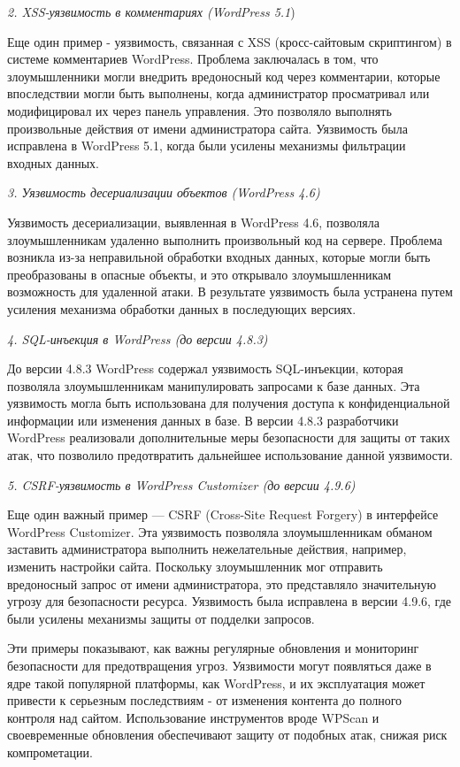 \begin{multicols}{2}
\emph{2. XSS-уязвимость в комментариях (WordPress 5.1})

Еще один пример - уязвимость, связанная с XSS (кросс-сайтовым
скриптингом) в системе комментариев WordPress. Проблема заключалась в
том, что злоумышленники могли внедрить вредоносный код через
комментарии, которые впоследствии могли быть выполнены, когда
администратор просматривал или модифицировал их через панель управления.
Это позволяло выполнять произвольные действия от имени администратора
сайта. Уязвимость была исправлена в WordPress 5.1, когда были усилены
механизмы фильтрации входных данных.

\emph{3. Уязвимость десериализации объектов (WordPress 4.6)}

Уязвимость десериализации, выявленная в WordPress 4.6, позволяла
злоумышленникам удаленно выполнить произвольный код на сервере. Проблема
возникла из-за неправильной обработки входных данных, которые могли быть
преобразованы в опасные объекты, и это открывало злоумышленникам
возможность для удаленной атаки. В результате уязвимость была устранена
путем усиления механизма обработки данных в последующих версиях.

\emph{4. SQL-инъекция в WordPress (до версии 4.8.3)}

До версии 4.8.3 WordPress содержал уязвимость SQL-инъекции, которая
позволяла злоумышленникам манипулировать запросами к базе данных. Эта
уязвимость могла быть использована для получения доступа к
конфиденциальной информации или изменения данных в базе. В версии 4.8.3
разработчики WordPress реализовали дополнительные меры безопасности для
защиты от таких атак, что позволило предотвратить дальнейшее
использование данной уязвимости.

\emph{5. CSRF-уязвимость в WordPress Customizer (до версии 4.9.6)}

Еще один важный пример --- CSRF (Cross-Site Request Forgery) в
интерфейсе WordPress Customizer. Эта уязвимость позволяла
злоумышленникам обманом заставить администратора выполнить нежелательные
действия, например, изменить настройки сайта. Поскольку злоумышленник
мог отправить вредоносный запрос от имени администратора, это
представляло значительную угрозу для безопасности ресурса. Уязвимость
была исправлена в версии 4.9.6, где были усилены механизмы защиты от
подделки запросов.

Эти примеры показывают, как важны регулярные обновления и мониторинг
безопасности для предотвращения угроз. Уязвимости могут появляться даже
в ядре такой популярной платформы, как WordPress, и их эксплуатация
может привести к серьезным последствиям - от изменения контента до
полного контроля над сайтом. Использование инструментов вроде WPScan и
своевременные обновления обеспечивают защиту от подобных атак, снижая
риск компрометации.


\end{multicols}
